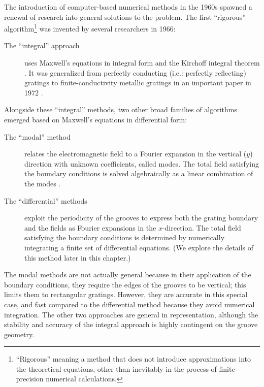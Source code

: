 The introduction of computer-based numerical methods in the 1960s spawned a renewal of research into general solutions to the problem.  The first ``rigorous'' algorithm\footnote{``Rigorous'' meaning a method that does not introduce approximations into the theoretical equations, other than inevitably in the process of finite-precision numerical calculations.} was invented by several researchers in 1966:
\begin{description}
\item[The ``integral'' approach] uses Maxwell's equations in integral form and the Kirchoff integral theorem \cite{Pet66}\cite{Wir69}\cite{Pav70}.  It was generalized from perfectly conducting (i.e.: perfectly reflecting) gratings to finite-conductivity metallic gratings in an important paper in 1972 \cite{May72}.
\end{description}
Alongside these ``integral'' methods, two other broad families of algorithms emerged based on Maxwell's equations in differential form:
\begin{description}
\item[The ``modal'' method] relates the electromagnetic field to a Fourier expansion in the vertical ($y$) direction with unknown coefficients, called modes. The total field satisfying the boundary conditions is solved algebraically as a linear combination of the modes \cite{Bot81}\cite{Bot81a}\cite{And81}.
\item[The ``differential'' methods] exploit the periodicity of the grooves to express both the grating boundary and the fields as Fourier expansions in the $x$-direction. The total field satisfying the boundary conditions is determined by numerically integrating a finite set of differential equations. (We explore the details of this method later in this chapter.)
\end{description}
The modal methods are not actually general because in their application of the boundary conditions, they require the edges of the grooves to be vertical; this limits them to rectangular gratings.  However, they are accurate in this special case, and fast compared to the differential method because they avoid numerical integration.  
The other two approaches are general in representation, although the stability and accuracy of the integral approach is highly contingent on the groove geometry.

